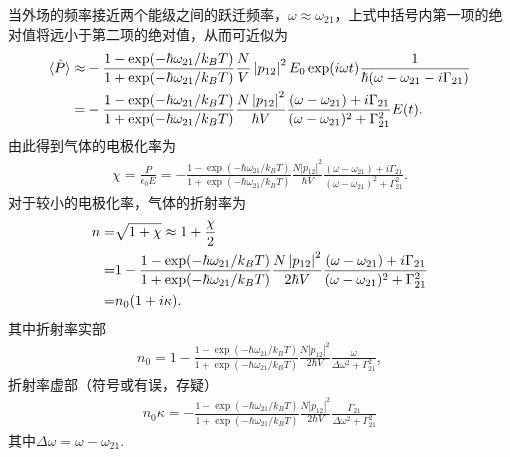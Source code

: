 \documentclass[a4paper, 10pt]{article}
\providecommand{\abs}[1]{\left\lvert#1\right\rvert} %
\begin{document}
\begin{multicols}{2}
\normalsize
当外场的频率接近两个能级之间的跃迁频率，$\omega\approx\omega_{21}$，上式中括号内第一项的绝对值将远小于第二项的绝对值，从而可近似为
\scriptsize
\begin{align}
    \notag\langle\hat{P}\rangle\approx&-\frac{1-\exp(-\hbar\omega_{21}/k_BT)}{1+\exp(-\hbar\omega_{21}/k_BT)}\frac{N}{V}\abs{p_{12}}^2E_0\exp(i\omega t)\frac{1}{\hbar(\omega-\omega_{21}-i\Gamma_{21})}\\
    =&-\frac{1-\exp(-\hbar\omega_{21}/k_BT)}{1+\exp(-\hbar\omega_{21}/k_BT)}\frac{N\abs{p_{12}}^2}{\hbar V}\frac{(\omega-\omega_{21})+i\Gamma_{21}}{(\omega-\omega_{21})^2+\Gamma_{21}^2}E(t).
\end{align}
\normalsize
由此得到气体的电极化率为
\small
\begin{align}
    \chi=\frac{P}{\epsilon_0E}=-\frac{1-\exp(-\hbar\omega_{21}/k_BT)}{1+\exp(-\hbar\omega_{21}/k_BT)}\frac{N\abs{p_{12}}^2}{\hbar V}\frac{(\omega-\omega_{21})+i\Gamma_{21}}{(\omega-\omega_{21})^2+\Gamma_{21}^2}.
\end{align}
\normalsize
对于较小的电极化率，气体的折射率为
\begin{align}
    \notag n=&\sqrt{1+\chi}\approx 1+\frac{\chi}{2}\\
    \notag=&1-\frac{1-\exp(-\hbar\omega_{21}/k_BT)}{1+\exp(-\hbar\omega_{21}/k_BT)}\frac{N\abs{p_{12}}^2}{2\hbar V}\frac{(\omega-\omega_{21})+i\Gamma_{21}}{(\omega-\omega_{21})^2+\Gamma_{21}^2}\\
    =&n_0(1+i\kappa).
\end{align}
其中折射率实部
\begin{align}
    n_0=1-\frac{1-\exp(-\hbar\omega_{21}/k_BT)}{1+\exp(-\hbar\omega_{21}/k_BT)}\frac{N\abs{p_{12}}^2}{2\hbar V}\frac{\omega}{\Delta\omega^2+\Gamma_{21}^2},
\end{align}
折射率虚部（符号或有误，存疑）
\begin{align}
    n_0\kappa=-\frac{1-\exp(-\hbar\omega_{21}/k_BT)}{1+\exp(-\hbar\omega_{21}/k_BT)}\frac{N\abs{p_{12}}^2}{2\hbar V}\frac{\Gamma_{21}}{\Delta\omega^2+\Gamma_{21}^2}
\end{align}
其中$\Delta\omega=\omega-\omega_{21}$.


\end{multicols}
\end{document}
